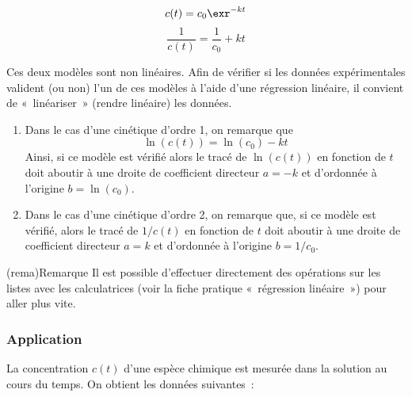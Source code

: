 \documentclass[a4paper, 12pt, garamond]{book}
\begin{document}
\begin{tcolorbox}[blankest]
	\begin{isd}
		\[
			c(t) = c_0 \exr^{-kt}
		\]
		\tcblower
		\[
			\frac{1}{c(t)} = \frac{1}{c_0} + kt
		\]
	\end{isd}
\end{tcolorbox}

%
%
%

Ces deux modèles sont non linéaires. Afin de vérifier si les données
expérimentales valident (ou non) l'un de ces modèles à l'aide d'une régression
linéaire, il convient de «~linéariser~» (rendre linéaire) les données.

\begin{enumerate}
	\item Dans le cas d'une cinétique d'ordre 1, on remarque que
	      \[
		      \ln(c(t)) = \ln(c_0)-kt
	      \]
	      Ainsi, si ce modèle est vérifié alors le tracé de $\ln(c(t))$ en
	      fonction de $t$ doit aboutir à une droite de coefficient directeur
	      $a=-k$ et d'ordonnée à l'origine $b = \ln(c_0)$.
	\item Dans le cas d'une cinétique d'ordre 2, on remarque que, si ce modèle
	      est vérifié, alors le tracé de $1/c(t)$ en fonction de $t$ doit aboutir
	      à une droite de coefficient directeur $a=k$ et d'ordonnée à l'origine $b
		      = 1/c_0$.
\end{enumerate}

\begin{tcn}(rema){Remarque}
	Il est possible d'effectuer directement des opérations sur les listes avec les
	calculatrices (voir la fiche pratique «~régression linéaire~») pour aller plus
	vite.
\end{tcn}

\subsubsection{Application}
La concentration $c(t)$ d'une espèce chimique est mesurée dans la solution au
cours du temps. On obtient les données suivantes~:
\end{document}
